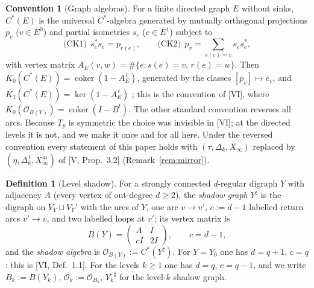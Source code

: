 \documentclass[11pt]{amsart}
\numberwithin{equation}{section}
\theoremstyle{definition}
\newtheorem{definition}[theorem]{Definition}
\newtheorem{convention}[theorem]{Convention}
\theoremstyle{remark}
\newcommand{\cO}{\mathcal{O}}
\newcommand{\coker}{\operatorname{coker}}
\newcommand{\shadow}[1]{{#1}^{\sharp}}
\begin{document}
\begin{convention}[Graph algebras]\label{conv}
For a finite directed graph $E$ without sinks, $C^*(E)$ is the universal $C^*$-algebra
generated by mutually orthogonal projections $p_v$ ($v\in E^0$) and partial isometries
$s_e$ ($e\in E^1$) subject to
\[
\text{(CK1)}\ \ s_e^*s_e=p_{r(e)},\qquad
\text{(CK2)}\ \ p_v=\sum_{s(e)=v}s_es_e^* ,
\]
with vertex matrix $A_E(v,w)=\#\{e:s(e)=v,\,r(e)=w\}$. Then $K_0(C^*(E))=\coker(1-A_E^{\,t})$,
generated by the classes $[p_v]\mapsto e_v$, and $K_1(C^*(E))=\ker(1-A_E^{\,t})$
\cite[Thm.~7.16]{R}; this is the convention of [VI], where $K_0(\cO_{B(Y)})=\coker(I-B^t)$.
The other standard convention reverses all arcs. Because $T_p$ is symmetric the choice
was invisible in [VI]; at the directed levels it is not, and we make it once and for all
here. Under the reversed convention every statement of this paper holds with
$(\tau,\Delta_k,X_\infty)$ replaced by $(\eta,\Delta_k^{\,t},X_\infty^{\mathrm{in}})$
of [V, Prop.~3.2] (Remark~\ref{rem:mirror}).
\end{convention}

\begin{definition}[Level shadow]\label{def:shadow}
For a strongly connected $d$-regular digraph $Y$ with adjacency $A$ (every vertex of
out-degree $d\ge2$), the \emph{shadow graph} $\shadow{Y}$ is the digraph on
$V_Y\sqcup V_Y'$ with the arcs of $Y$, one arc $v\to v'$, $c:=d-1$ labelled return arcs
$v'\to v$, and two labelled loops at $v'$; its vertex matrix is
\[
B(Y)=\begin{pmatrix}A&I\\ cI&2I\end{pmatrix},\qquad c=d-1 ,
\]
and the \emph{shadow algebra} is $\cO_{B(Y)}:=C^*(\shadow{Y})$. For $Y=Y_0$ one has
$d=q{+}1$, $c=q$: this is [VI, Def.~1.1]. For the levels $k\ge1$ one has $d=q$,
$c=q-1$, and we write $B_k:=B(Y_k)$, $\cO_k:=\cO_{B_k}$, $\shadow{Y_k}$ for the
level-$k$ shadow graph.
\end{definition}
\end{document}
